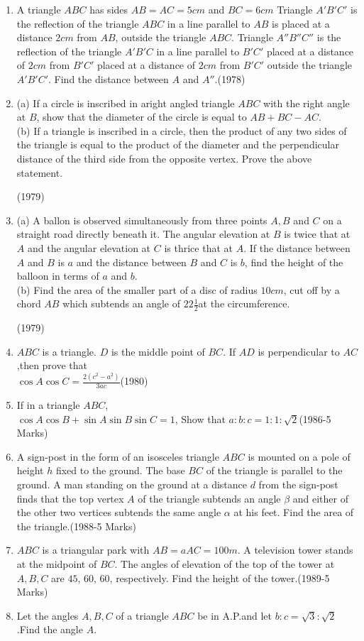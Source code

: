 \documentclass[journal,12pt,twocolumn]{IEEEtran}
\theoremstyle{remark}
\begin{document}
\begin{enumerate}
    \item A triangle $ABC$ has sides $AB=AC=5cm$ and $BC=6cm$ Triangle $A'B'C'$ is the reflection of the triangle $ABC$ in a line parallel to $AB$ is placed at a distance $2cm$ from $AB$, outside the triangle $ABC$. Triangle $A''B''C''$ is the reflection of the triangle $A'B'C$ in a line parallel to $B'C'$ placed at a distance of $2cm$ from $B'C'$ placed at a distance of $2cm$ from $B'C'$ outside the triangle $A'B'C'$. Find the distance between $A$ and $A''$.\hfill(1978)
    \item (a) If a circle is inscribed in aright angled triangle $ABC$ with the right angle at $B$, show that the diameter of the circle is equal to $AB+BC-AC$.\\
    (b) If a triangle is inscribed in a circle, then the product of any two sides of the triangle is equal to the product of the diameter and the perpendicular distance of the third side from the opposite vertex. Prove the above statement.
    
    \hfill(1979)
    \item (a) A ballon is observed simultaneously from three points $A,B$ and $C$ on a straight road directly beneath it. The angular elevation at $B$ is twice that at $A$ and the angular elevation at $C$ is thrice that at $A$. If the distance between $A$ and $B$ is $a$ and the distance between $B$ and $C$ is $b$, find the height of the balloon in terms of $a$ and $b$.\\
    (b) Find the area of the smaller part of a disc of radius $10cm$, cut off by a chord $AB$ which subtends an angle of $22\frac{1}{2}$\textdegree at the circumference.

    \hfill(1979)
    \item $ABC$ is a triangle. $D$ is the middle point of $BC$. If $AD$ is perpendicular to $AC$,then prove that \\
    $\cos A \cos C = \frac{2(c^2 - a^2)}{3ac}$\hfill(1980)
    \item If in a triangle $ABC$,\\ $\cos A \cos B+\sin A \sin B \sin C=1$, Show that $a:b:c=1:1:\sqrt{2}$\hfill(1986-5 Marks)
    \item A sign-post in the form of an isosceles triangle $ABC$ is mounted on a pole of height $h$ fixed to the ground. The base $BC$ of the triangle is parallel to the ground. A man standing on the ground at a distance $d$ from the sign-post finds that the top vertex $A$ of the triangle subtends an angle $\beta$ and either of the other two vertices subtends the same angle $\alpha$ at his feet. Find the area of the triangle.\hfill(1988-5 Marks)
    \item $ABC$ is a triangular park with $AB=aAC=100m$. A television tower stands at the midpoint of $BC$. The angles of elevation of the top of the tower at $A,B,C$ are $45$\textdegree, $60$\textdegree, $60$\textdegree, respectively. Find the height of the tower.\hfill(1989-5 Marks)
    \item Let the angles $A,B,C$ of a triangle $ABC$ be in A.P.and let $b:c=\sqrt{3}:\sqrt{2}$.Find the angle $A$.
    

\end{enumerate}
\end{document}
